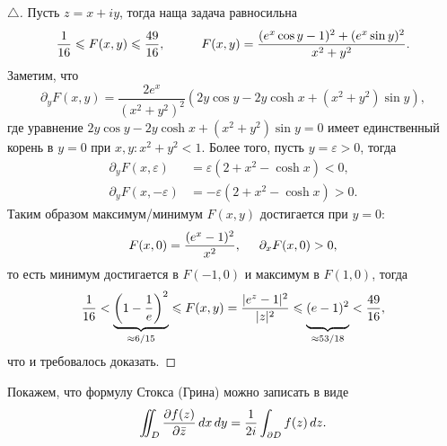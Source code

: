 \begin{proof}[$\triangle$]

Пусть $z = x + i y$, тогда наща задача равносильна
\begin{equation*}
    \frac{1}{16} \leq 
    F(x, y)
    \leq \frac{49}{16},
    \hspace{10 mm} 
    F(x, y) = \frac{(e^x \cos y - 1)^2 + (e^x \sin y)^2}{x^2 + y^2}.
\end{equation*}
Заметим, что
\begin{equation*}
    \partial_y F(x, y) = \frac{2 e^x}{(x^2 + y^2)^2} \left(
        2 y \cos y - 2 y \cosh x + (x^2 + y^2) \sin y
    \right),
\end{equation*}
где уравнение $2 y \cos y - 2 y \cosh x + (x^2 + y^2) \sin y = 0$ имеет единственный корень в $y =0$ при $x, y \colon  x^2 + y^2 < 1$. Более того, пусть $y = \varepsilon > 0$, тогда
\begin{align*}
    \partial_y F(x, \varepsilon) &= \varepsilon ( 2 + x^2 - \cosh x) < 0, \\
    \partial_y F(x, -\varepsilon) &= -\varepsilon ( 2 + x^2 - \cosh x) > 0.
\end{align*}
Таким образом максимум/минимум $F(x, y)$ достигается при $y = 0$:
\begin{equation*}
    F(x, 0) = \frac{(e^x - 1)^2}{x^2}, 
    \hspace{5 mm} 
    \partial_x F(x, 0) > 0,
\end{equation*}
то есть минимум достигается в $F(-1, 0)$ и максимум в $F(1, 0)$, тогда
\begin{equation*}
    \frac{1}{16} <
        \underbrace{\left(1 - \frac{1}{e}\right)^2}_{\approx 6/15}
    \leq 
    F(x, y) =  \frac{|e^z - 1|^2}{|z|^2}
    \leq
    \underbrace{(e-1)^2 \vphantom{\bigg|}}_{\approx 53/18}  
    < \frac{49}{16},
\end{equation*}
что и требовалось доказать. 

\end{proof}




Покажем, что формулу Стокса (Грина) можно записать в виде
\begin{equation*}
    \iint_D \frac{\partial f (z)}{\partial \bar{z}} \d x \d y = 
    \frac{1}{2i} \int_{\partial D} f(z) \d z.
\end{equation*}

